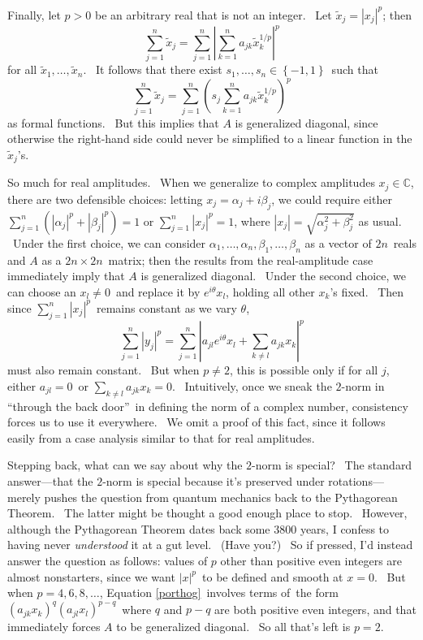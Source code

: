 \documentclass[12pt]{article}%
\begin{document}
Finally, let $p>0$ be an arbitrary real that is not an integer. \ Let
$\widetilde{x}_{j}=\left\vert x_{j}\right\vert ^{p}$; then%
\[
\sum_{j=1}^{n}\widetilde{x}_{j}=\sum_{j=1}^{n}\left\vert \sum_{k=1}^{n}%
a_{jk}\widetilde{x}_{k}^{1/p}\right\vert ^{p}%
\]
for all $\widetilde{x}_{1},\ldots,\widetilde{x}_{n}$. \ It follows that there
exist $s_{1},\ldots,s_{n}\in\left\{  -1,1\right\}  $\ such that%
\[
\sum_{j=1}^{n}\widetilde{x}_{j}=\sum_{j=1}^{n}\left(  s_{j}\sum_{k=1}%
^{n}a_{jk}\widetilde{x}_{k}^{1/p}\right)  ^{p}%
\]
as formal functions. \ But this implies that $A$ is generalized diagonal,
since otherwise the right-hand side could never be simplified to a linear
function in the $\widetilde{x}_{j}$'s.

So much for real amplitudes. \ When we generalize to complex amplitudes
$x_{j}\in\mathbb{C}$, there are two defensible choices: letting $x_{j}%
=\alpha_{j}+i\beta_{j}$, we could require either $\sum_{j=1}^{n}\left(
\left\vert \alpha_{j}\right\vert ^{p}+\left\vert \beta_{j}\right\vert
^{p}\right)  =1$ or $\sum_{j=1}^{n}\left\vert x_{j}\right\vert ^{p}=1$, where
$\left\vert x_{j}\right\vert =\sqrt{\alpha_{j}^{2}+\beta_{j}^{2}}$ as usual.
\ Under the first choice, we can consider $\alpha_{1},\ldots,\alpha_{n}%
,\beta_{1},\ldots,\beta_{n}$ as a vector of $2n$\ reals and $A$ as a
$2n\times2n$\ matrix; then the results from the real-amplitude case
immediately imply that $A$ is generalized diagonal. \ Under the second choice,
we can choose an $x_{l}\neq0$\ and replace it by $e^{i\theta}x_{l}$, holding
all other $x_{k}$'s fixed. \ Then since $\sum_{j=1}^{n}\left\vert
x_{j}\right\vert ^{p}$\ remains constant as we vary $\theta$,%
\[
\sum_{j=1}^{n}\left\vert y_{j}\right\vert ^{p}=\sum_{j=1}^{n}\left\vert
a_{jl}e^{i\theta}x_{l}+\sum_{k\neq l}a_{jk}x_{k}\right\vert ^{p}%
\]
must also remain constant. \ But when $p\neq2$, this is possible only if for
all $j$, either $a_{jl}=0$\ or $\sum_{k\neq l}a_{jk}x_{k}=0$. \ Intuitively,
once we sneak the $2$-norm in \textquotedblleft through the back
door\textquotedblright\ in defining the norm of a complex number, consistency
forces us to use it everywhere. \ We omit a proof of this fact, since it
follows easily from a case analysis similar to that for real amplitudes.

Stepping back, what can we say about why the $2$-norm is special? \ The
standard answer---that the $2$-norm is special because it's preserved under
rotations---merely pushes the question from quantum mechanics back to the
Pythagorean Theorem. \ The latter might be thought a good enough place to
stop. \ However, although the Pythagorean Theorem dates back some 3800 years,
I confess to having never \textit{understood} it at a gut level. \ (Have you?)
\ So if pressed, I'd instead answer the question as follows: values of $p$
other than positive even integers are almost nonstarters, since we want
$\left\vert x\right\vert ^{p}$\ to be defined and smooth at $x=0$. \ But when
$p=4,6,8,\ldots$, Equation \ref{porthog}\ involves terms of\ the form $\left(
a_{jk}x_{k}\right)  ^{q}\left(  a_{jl}x_{l}\right)  ^{p-q}$\ where $q$ and
$p-q$ are both positive even integers, and that immediately forces $A$ to be
generalized diagonal. \ So all that's left is $p=2$.
\end{document}
